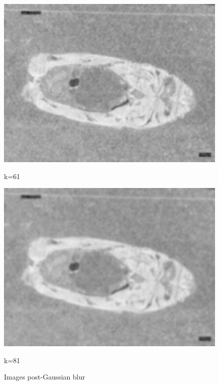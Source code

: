 \begin{figure}
\begin{minipage}{0.24\textwidth}
        \includegraphics[width=\textwidth]{./fig/gausssian/blurred61.jpg}
        \caption*{k=61}
        \label{fig:blurred61}
    \end{minipage}
    \begin{minipage}{0.24\textwidth}
        \centering
        \includegraphics[width=\textwidth]{./fig/gausssian/blurred81.jpg}
        \caption*{k=81}
        \label{fig:blurred81}
    \end{minipage}
    \caption{Images post-Gaussian blur}
    \label{fig:blurred}
\end{figure}

